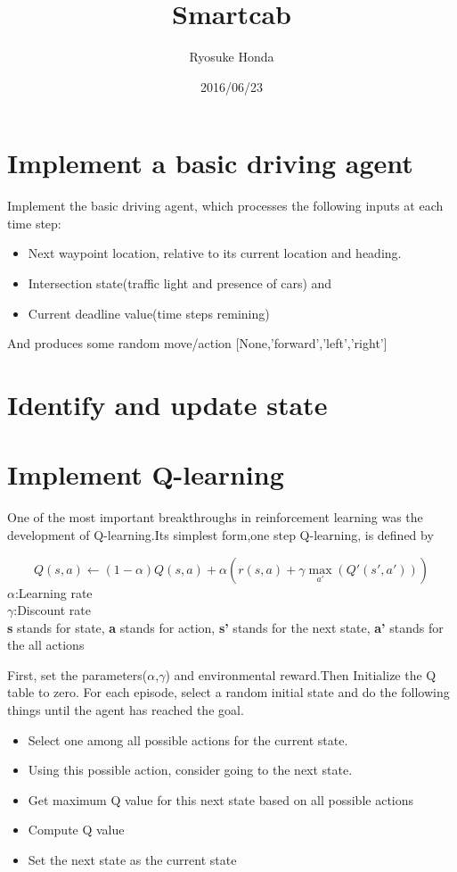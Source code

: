 \documentclass[a4paper,11pt]{article}
\begin{document}
\title{Smartcab}
\author{Ryosuke Honda}
\date{2016/06/23}
\maketitle





\section{Implement a basic driving agent}
Implement the basic driving agent, which processes the following inputs at each time step:
\begin{itemize}
\item Next waypoint location, relative to its current location and heading.
\item Intersection state(traffic light and presence of cars) and
\item Current deadline value(time steps remining)
\end{itemize}
And produces some random move/action [None,'forward','left','right']








\section{Identify and update state}







\section{Implement Q-learning}
One of the most important breakthroughs in reinforcement learning was the development of Q-learning.Its simplest form,one step Q-learning, is defined by

\begin{equation}
	Q(s,a)\leftarrow (1-\alpha)Q(s,a)+\alpha(r(s,a)+\gamma \max_{a'}(Q'(s',a')))
\end{equation}
$\alpha$:Learning rate　\\
$\gamma$:Discount rate \\
{\bf s} stands for state, {\bf a} stands for action, {\bf s'} stands for the next state, {\bf a'} stands for the all actions


First, set the parameters($\alpha$,$\gamma$) and environmental reward.Then Initialize the Q table to zero. For each episode, select a random initial state and do the following things until the agent has reached the goal.
\begin{itemize}
\item Select one among all possible actions for the current state.
\item Using this possible action, consider going to the next state.
\item Get maximum Q value for this next state based on all possible actions
\item Compute Q value
\item Set the next state as the current state
\end{itemize}
\end{document}
